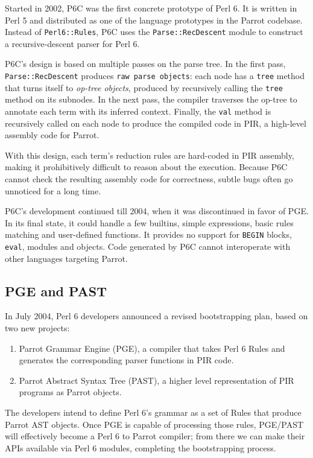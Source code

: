 \documentclass[]{sigplanconf}
\newcommand{\code}[1]{\texttt{#1}}
\begin{document}
Started in 2002, P6C was the first concrete prototype of Perl 6.  It is
written in Perl 5 and distributed as one of the language prototypes in the
Parrot codebase.  Instead of \texttt{Perl6::Rules}, P6C uses the
\texttt{Parse::RecDescent} module to construct a recursive-descent parser for
Perl 6.

P6C's design is based on multiple passes on the parse tree.  In the first
pass, \texttt{Parse::RecDescent} produces \texttt{raw parse objects}: each node
has a \texttt{tree} method that turns itself to \emph{op-tree objects},
produced by recursively calling the \code{tree} method on its subnodes.  In
the next pass, the compiler traverses the op-tree to annotate each term with
its inferred context.  Finally, the \code{val} method is recursively called
on each node to produce the compiled code in PIR, a high-level assembly code
for Parrot.

With this design, each term's reduction rules are hard-coded in PIR assembly,
making it prohibitively difficult to reason about the execution.  Because P6C
cannot check the resulting assembly code for correctness, subtle bugs often
go unnoticed for a long time.

P6C's development continued till 2004, when it was discontinued in
favor of PGE.  In its final state, it could handle a few builtins, simple
expressions, basic rules matching and user-defined functions.  It provides no
support for \code{BEGIN} blocks, \code{eval}, modules and objects.  Code
generated by P6C cannot interoperate with other languages targeting Parrot.

\subsection{PGE and PAST}
\label{sec:PGEandPAST}

In July 2004, Perl 6 developers announced a revised bootstrapping plan,
based on two new projects:

\begin{enumerate}
\item Parrot Grammar Engine (PGE), a compiler that takes Perl 6 Rules and
  generates the corresponding parser functions in PIR code.

\item Parrot Abstract Syntax Tree (PAST), a higher level representation
  of PIR programs as Parrot objects.
\end{enumerate}

The developers intend to define Perl 6's grammar as a set of Rules that produce
Parrot AST objects.  Once PGE is capable of processing those rules, PGE/PAST
will effectively become a Perl 6 to Parrot compiler; from there we can make
their APIs available via Perl 6 modules, completing the bootstrapping process.
\end{document}
